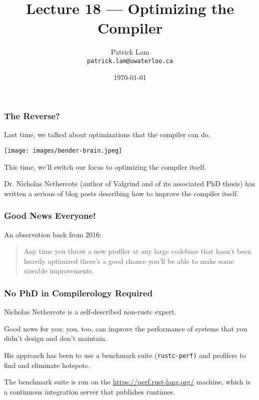 


\title{Lecture 18 --- Optimizing the Compiler}

\author{Patrick Lam \\ \small \texttt{patrick.lam@uwaterloo.ca}}
\date{\today}




\begin{frame}
  \titlepage

\end{frame}


\begin{frame}
\frametitle{The Reverse?}

Last time, we talked about optimizations that the compiler can do.

\begin{center}
	\texttt{[image: images/bender-brain.jpeg]}
\end{center}

This time, we'll switch our focus to optimizing the compiler itself.

Dr. Nicholas Nethercote (author of Valgrind and of its associated PhD thesis) has written a serious of blog posts describing how to improve the compiler itself.

\end{frame}


\begin{frame}
\frametitle{Good News Everyone!}

An observation back from 2016:
\begin{quote}
Any time you throw a new profiler at any large codebase that hasn't been heavily optimized there's a good chance you'll be able to make some sizeable improvements.
\end{quote}

\end{frame}


\begin{frame}
\frametitle{No PhD in Compilerology Required}

Nicholas Nethercote is a self-described non-rustc expert. 

Good news for you: you, too, can improve the performance of systems that you didn't design and don't maintain. 

His approach has been to use a benchmark suite (\texttt{rustc-perf)}
and profilers to find and eliminate hotspots.

The benchmark suite is run on the \url{https://perf.rust-lang.org/} machine, which is a continuous integration server that publishes runtimes.

\end{frame}


